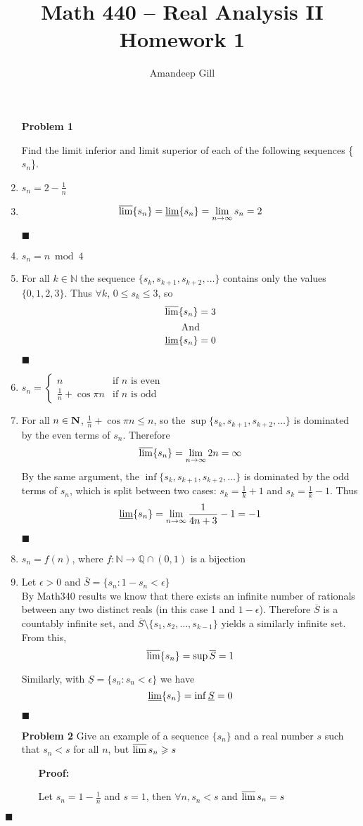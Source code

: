 \documentclass[a4paper, 12pt]{report}
\newcommand{\proof}[3]{
	\begin{enumerate}
		\item[\bf{Problem #1}] #2
		\begin{enumerate}
			\item[\bf{Proof:}]
			#3
		\end{enumerate}
	\end{enumerate}
	\begin{flushright}
		$\blacksquare$
	\end{flushright}
}
\newcommand{\problem}[2]{
	\begin{enumerate}
		\item[\bf{Problem #1}] 
		#2
	\end{enumerate}
}
\newcommand{\subproof}[3]{
	\item[#1] #2
	\item[\bf{Proof:}]
	#3 
	\begin{flushright}
		$\blacksquare$
	\end{flushright}
}
\begin{document}
\title{Math 440 -- Real Analysis II \\ \vspace{7px} \large{Homework 1}}
\author{Amandeep Gill}
\maketitle

\problem{1}{
	Find the limit inferior and limit superior of each of the following sequences \{$s_n$\}. \\
	\subproof{(a)}{$s_n = 2 - \frac{1}{n}$}{
		\[\varlimsup\{s_n\}=\varliminf\{s_n\}=\lim\limits_{n\to\infty}{s_n}=2\]
	}
	\subproof{(b)}{$s_n = n \bmod{4}$}{
		For all $k \in \mathbb{N}$ the sequence $\{s_k, s_{k+1}, s_{k+2}, \ldots\}$ contains only the values $\{0, 1, 2, 3\}$. Thus $\forall{k}$, $0 \leqslant s_k \leqslant 3$, so
		\[\varlimsup \{s_n\} = 3 \]
		\[\text{And}\]
		\[\varliminf \{s_n\} = 0 \] 
	}
	\subproof{(c)}{
		$s_n = \left\{
				\begin{array}{ll}
					n & \text{if $n$ is even} \\
					\frac{1}{n} + \cos{\pi n} & \text{if $n$ is odd}
				\end{array}
			\right.
		$
	}{
		For all $n \in \bf{N}$, $\frac{1}{n} + \cos{\pi n} \leq n$, so the $\sup\{s_k, s_{k+1}, s_{k+2}, \ldots\}$ is dominated by the even terms of $s_n$. Therefore
		\[\varlimsup \{s_n\} = \lim\limits_{n \to \infty}{2n} = \infty\]
		By the same argument, the $\inf\{s_k, s_{k+1}, s_{k+2}, \ldots\}$ is dominated by the odd terms of $s_n$, which is split between two cases: $s_k = \frac{1}{k} + 1$ and $s_k = \frac{1}{k} - 1$. Thus
		\[\varliminf \{s_n\} = \lim\limits_{n\to\infty}{\frac{1}{4n+3}-1}= -1\]
	}
	\pagebreak
	\subproof{(d)}{$s_n = f(n)$, where $f \colon \mathbb{N} \to \mathbb{Q} \cap (0,1)$ is a bijection}{
		Let $\epsilon > 0$ and $\overline{S} = \{s_n \colon 1 - s_n < \epsilon\}$ \\
		By Math340 results we know that there exists an infinite number of rationals between any two distinct reals (in this case 1 and $1 - \epsilon$). Therefore $\overline{S}$ is a countably infinite set, and $\overline{S} \setminus \{s_1, s_2, \ldots, s_{k-1}\}$ yields a similarly infinite set. From this,
		\[\varlimsup \{s_n\} = \sup{\overline{S}} = 1\] 
		
		Similarly, with $\underline{S} = \{s_n \colon s_n < \epsilon\}$ we have 
		\[\varliminf \{s_n\} = \inf{\underline{S}} = 0\]
	}
}

\proof{2}{
	Give an example of a sequence $\{s_n\}$ and a real number $s$ such that $s_n < s$ for all $n$, but $\varlimsup s_n \geqslant s$
}{
	Let $s_n = 1-\frac{1}{n}$ and $s = 1$, then $\forall n, s_n < s$ and $\varlimsup s_n = s$
}
\end{document}
